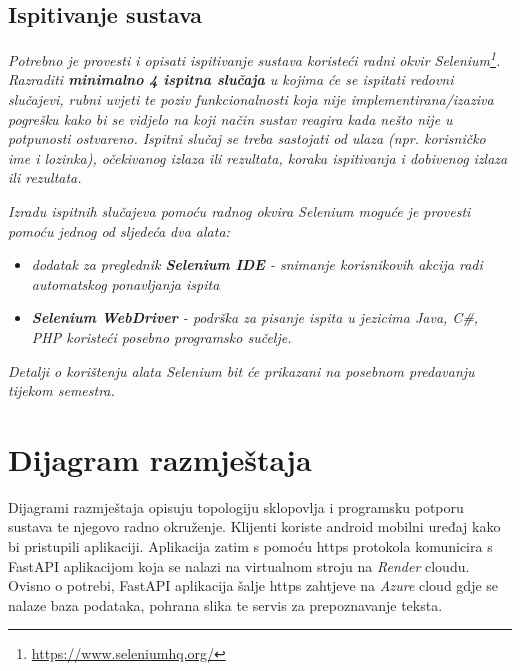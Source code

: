 			
			\subsection{Ispitivanje sustava}
			
			 \textit{Potrebno je provesti i opisati ispitivanje sustava koristeći radni okvir Selenium\footnote{\url{https://www.seleniumhq.org/}}. Razraditi \textbf{minimalno 4 ispitna slučaja} u kojima će se ispitati redovni slučajevi, rubni uvjeti te poziv funkcionalnosti koja nije implementirana/izaziva pogrešku kako bi se vidjelo na koji način sustav reagira kada nešto nije u potpunosti ostvareno. Ispitni slučaj se treba sastojati od ulaza (npr. korisničko ime i lozinka), očekivanog izlaza ili rezultata, koraka ispitivanja i dobivenog izlaza ili rezultata.\\ }
			 
			 \textit{Izradu ispitnih slučajeva pomoću radnog okvira Selenium moguće je provesti pomoću jednog od sljedeća dva alata:}
			 \begin{itemize}
			 	\item \textit{dodatak za preglednik \textbf{Selenium IDE} - snimanje korisnikovih akcija radi automatskog ponavljanja ispita	}
			 	\item \textit{\textbf{Selenium WebDriver} - podrška za pisanje ispita u jezicima Java, C\#, PHP koristeći posebno programsko sučelje.}
			 \end{itemize}
		 	\textit{Detalji o korištenju alata Selenium bit će prikazani na posebnom predavanju tijekom semestra.}
			
			\eject 
		
		
		\section{Dijagram razmještaja}
			
			 {Dijagrami razmještaja opisuju topologiju sklopovlja i programsku potporu sustava te njegovo radno okruženje. Klijenti koriste android mobilni uređaj kako bi pristupili aplikaciji. Aplikacija zatim s pomoću https protokola komunicira s FastAPI aplikacijom koja se nalazi na virtualnom stroju na \textit{Render} cloudu. Ovisno o potrebi, FastAPI aplikacija šalje https zahtjeve na \textit{Azure} cloud gdje se nalaze baza podataka, pohrana slika te servis za prepoznavanje teksta.}
			 
